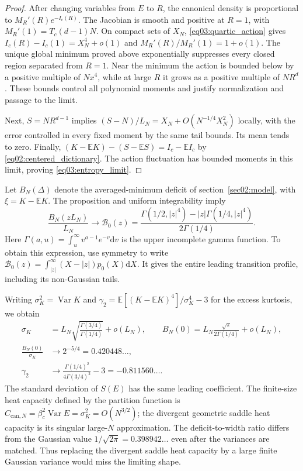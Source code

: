 \documentclass[11pt,letterpaper]{article}
\newcommand{\E}{\mathbb{E}}
\DeclareMathOperator{\Var}{Var}
\newcommand{\dd}{\mathrm{d}}
\theoremstyle{plain}
\theoremstyle{definition}
\theoremstyle{remark}
\begin{document}
\begin{proof}
After changing variables from $E$ to $R$, the canonical density is
proportional to $M_R'(R)e^{-I_c(R)}$.  The Jacobian is smooth and
positive at $R=1$, with $M_R'(1)=T_c(d-1)N$.  On compact sets of
$X_N$, \eqref{eq03:quartic_action} gives
$I_c(R)-I_c(1)=X_N^4+o(1)$ and
$M_R'(R)/M_R'(1)=1+o(1)$.  The unique global minimum proved above
exponentially suppresses every closed region separated from $R=1$.
Near the minimum the action is bounded below by a positive multiple
of $Nx^4$, while at large $R$ it grows as a positive multiple of
$NR^d$.  These bounds control all polynomial moments and justify
normalization and passage to the limit.

Next, $S=NR^{d-1}$ implies
$(S-N)/L_N=X_N+O(N^{-1/4}X_N^2)$ locally, with the error controlled
in every fixed moment by the same tail bounds.  Its mean tends to
zero.  Finally,
$(K-\E K)-(S-\E S)=I_c-\E I_c$ by
\eqref{eq02:centered_dictionary}.  The action fluctuation has
bounded moments in this limit, proving \eqref{eq03:entropy_limit}.
\end{proof}

Let $B_N(\Delta)$ denote the averaged-minimum deficit of
section~\ref{sec02:model}, with $\xi=K-\E K$.  The proposition and
uniform integrability imply
\begin{equation}
 \frac{B_N(zL_N)}{L_N}\longrightarrow\mathcal B_0(z)
 =\frac{\Gamma(1/2,|z|^4)
         -|z|\Gamma(1/4,|z|^4)}{2\Gamma(1/4)}.
 \label{eq03:quartic_profile}
\end{equation}
Here $\Gamma(a,u)=\int_u^\infty v^{a-1}e^{-v}\dd v$ is the upper
incomplete gamma function.  To obtain this expression, use symmetry
to write $\mathcal B_0(z)=\int_{|z|}^\infty
(X-|z|)p_0(X)\dd X$.  It gives the entire leading transition
profile, including its non-Gaussian tails.

Writing $\sigma_K^2=\Var K$ and
$\gamma_2=\E[(K-\E K)^4]/\sigma_K^4-3$ for the excess kurtosis,
we obtain
\begin{align}
 \sigma_K&=L_N
  \sqrt{\frac{\Gamma(3/4)}{\Gamma(1/4)}}+o(L_N),
 \qquad
 B_N(0)=L_N\frac{\sqrt\pi}{2\Gamma(1/4)}+o(L_N),
 \label{eq03:width_deficit}\\
 \frac{B_N(0)}{\sigma_K}&\longrightarrow2^{-5/4}
       =0.420448\ldots,
 \nonumber\\
 \gamma_2&\longrightarrow
  \frac{\Gamma(1/4)^2}{4\Gamma(3/4)^2}-3
       =-0.811560\ldots.
 \label{eq03:shape_constants}
\end{align}
The standard deviation of $S(E)$ has the same leading coefficient.
The finite-size heat capacity defined by the partition function is
$C_{\mathrm{can},N}=\beta_c^2\Var E=\sigma_K^2=O(N^{3/2})$;
the divergent geometric saddle heat capacity is its singular
large-$N$ approximation.
The deficit-to-width ratio differs from the Gaussian value
$1/\sqrt{2\pi}=0.398942\ldots$ even after the variances are matched.
Thus replacing the divergent saddle heat capacity by a large finite
Gaussian variance would miss the limiting shape.
\end{document}
